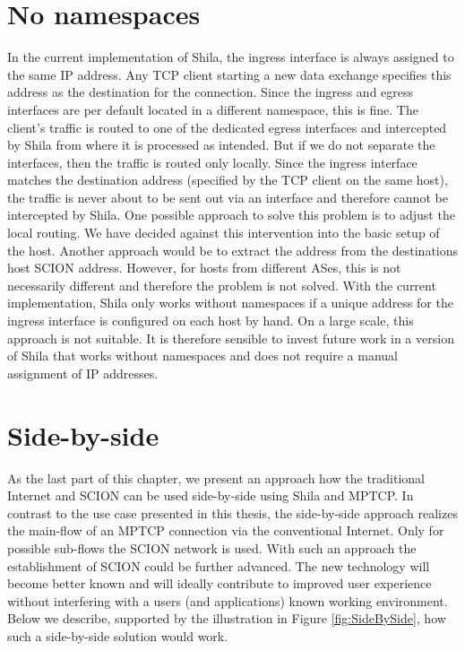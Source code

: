 \section*{No namespaces}

In the current implementation of Shila, the ingress interface is always assigned to the same IP address. Any TCP client starting a new data exchange specifies this address as the destination for the connection. Since the ingress and egress interfaces are per default located in a different namespace, this is fine. The client's traffic is routed to one of the dedicated egress interfaces and intercepted by Shila from where it is processed as intended. But if we do not separate the interfaces, then the traffic is routed only locally. Since the ingress interface matches the destination address (specified by the TCP client on the same host), the traffic is never about to be sent out via an interface and therefore cannot be intercepted by Shila. One possible approach to solve this problem is to adjust the local routing. We have decided against this intervention into the basic setup of the host. Another approach would be to extract the address from the destinations host SCION address. However, for hosts from different ASes, this is not necessarily different and therefore the problem is not solved.  With the current implementation, Shila only works without namespaces if a unique address for the ingress interface is configured on each host by hand. On a large scale, this approach is not suitable. It is therefore sensible to invest future work in a version of Shila that works without namespaces and does not require a manual assignment of IP addresses.

\section*{Side-by-side}

As the last part of this chapter, we present an approach how the traditional Internet and SCION can be used side-by-side using Shila and MPTCP. In contrast to the use case presented in this thesis, the side-by-side approach realizes the main-flow of an MPTCP connection via the conventional Internet. Only for possible sub-flows the SCION network is used. With such an approach the establishment of SCION could be further advanced. The new technology will become better known and will ideally contribute to improved user experience without interfering with a users (and applications) known working environment. Below we describe, supported by the illustration in Figure \ref{fig:SideBySide}, how such a side-by-side solution would work.

